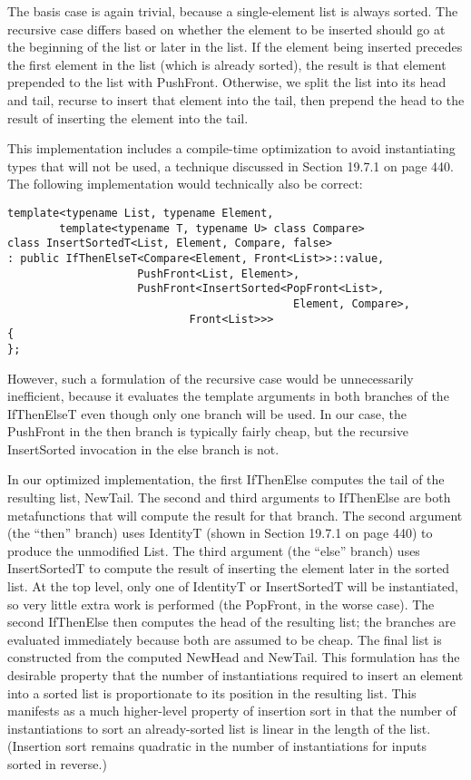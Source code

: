 The basis case is again trivial, because a single-element list is always sorted. The recursive case differs based on whether the element to be inserted should go at the beginning of the list or later in the list. If the element being inserted precedes the first element in the list (which is already sorted), the result is that element prepended to the list with PushFront. Otherwise, we split the list into its head and tail, recurse to insert that element into the tail, then prepend the head to the result of inserting the element into the tail.

This implementation includes a compile-time optimization to avoid instantiating types that will not be used, a technique discussed in Section 19.7.1 on page 440. The following implementation would technically also be correct:

\begin{lstlisting}[style=styleCXX]
template<typename List, typename Element,
		template<typename T, typename U> class Compare>
class InsertSortedT<List, Element, Compare, false>
: public IfThenElseT<Compare<Element, Front<List>>::value,
					PushFront<List, Element>,
					PushFront<InsertSorted<PopFront<List>,
											Element, Compare>,
							Front<List>>>
{
};
\end{lstlisting}

However, such a formulation of the recursive case would be unnecessarily inefficient, because it evaluates the template arguments in both branches of the IfThenElseT even though only one branch will be used. In our case, the PushFront in the then branch is typically fairly cheap, but the recursive InsertSorted invocation in the else branch is not.

In our optimized implementation, the first IfThenElse computes the tail of the resulting list, NewTail. The second and third arguments to IfThenElse are both metafunctions that will compute the result for that branch. The second argument (the “then” branch) uses IdentityT (shown in Section 19.7.1 on page 440) to produce the unmodified List. The third argument (the “else” branch) uses InsertSortedT to compute the result of inserting the element later in the sorted list. At the top level, only one of IdentityT or InsertSortedT will be instantiated, so very little extra work is performed (the PopFront, in the worse case). The second IfThenElse then computes the head of the resulting list; the branches are evaluated immediately because both are assumed to be cheap. The final list is constructed from the computed NewHead and NewTail. This formulation has the desirable property that the number of instantiations required to insert an element into a sorted list is proportionate to its position in the resulting list. This manifests as a much higher-level property of insertion sort in that the number of instantiations to sort an already-sorted list is linear in the length of the list. (Insertion sort remains quadratic in the number of instantiations for inputs sorted in reverse.)

